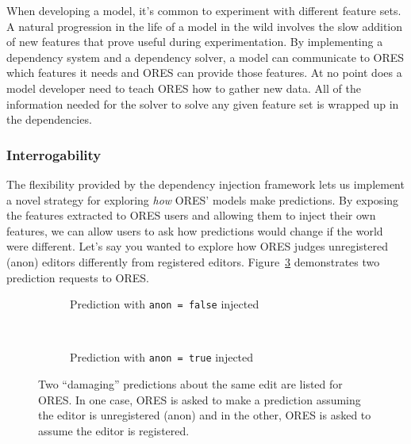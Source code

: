When developing a model, it's common to experiment with different feature sets.  A natural progression in the life of a model in the wild involves the slow addition of new features that prove useful during experimentation.  By implementing a dependency system and a dependency solver, a model can communicate to ORES which features it needs and ORES can provide those features.  At no point does a model developer need to teach ORES how to gather new data.  All of the information needed for the solver to solve any given feature set is wrapped up in the dependencies.

\subsubsection{Interrogability}
The flexibility provided by the dependency injection framework lets us implement a novel strategy for exploring \emph{how} ORES' models make predictions.  By exposing the features extracted to ORES users and allowing them to inject their own features, we can allow users to ask how predictions would change if the world were different.  Let's say you wanted to explore how ORES judges unregistered (anon) editors differently from registered editors.  Figure~\ref{fig:anon_injection} demonstrates two prediction requests to ORES.

\begin{figure}[h]
\centering
\begin{subfigure}[t]{.5\textwidth}
  \caption{Prediction with \texttt{anon = false} injected}
  \label{fig:anon_injection_false}
\end{subfigure}~~
\begin{subfigure}[t]{.5\textwidth}
  \caption{Prediction with \texttt{anon = true} injected}
  \label{fig:anon_injection_true}
\end{subfigure}
\caption{Two ``damaging'' predictions about the same edit are listed for ORES.  In one case, ORES is asked to make a prediction assuming the editor is unregistered (anon) and in the other, ORES is asked to assume the editor is registered.}
\label{fig:anon_injection}
\end{figure}

